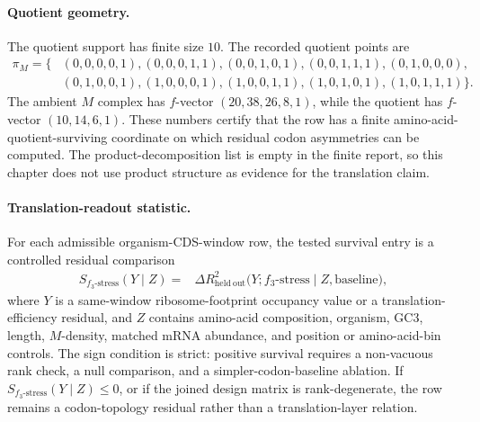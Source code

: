 \paragraph{Quotient geometry.}
The quotient support has finite size $10$.  The recorded quotient points are
$$
\begin{aligned}
\pi_M=\{&(0,0,0,0,1),(0,0,0,1,1),(0,0,1,0,1),(0,0,1,1,1),(0,1,0,0,0),\\
&(0,1,0,0,1),(1,0,0,0,1),(1,0,0,1,1),(1,0,1,0,1),(1,0,1,1,1)\}.
\end{aligned}
$$
The ambient $M$ complex has $f$-vector $(20,38,26,8,1)$, while the quotient has $f$-vector $(10,14,6,1)$.  These numbers certify that the row has a finite amino-acid-quotient-surviving coordinate on which residual codon asymmetries can be computed.  The product-decomposition list is empty in the finite report, so this chapter does not use product structure as evidence for the translation claim.

\paragraph{Translation-readout statistic.}
For each admissible organism-CDS-window row, the tested survival entry is a controlled residual comparison
$$
\begin{aligned}
S_{f_3\text{-stress}}(Y\mid Z)
  ={}&\Delta R^2_{\mathrm{held\ out}}\bigl(Y; f_3\text{-stress}\mid Z,\mathrm{baseline}\bigr),
\end{aligned}
$$
where $Y$ is a same-window ribosome-footprint occupancy value or a translation-efficiency residual, and $Z$ contains amino-acid composition, organism, GC3, length, $M$-density, matched mRNA abundance, and position or amino-acid-bin controls.  The sign condition is strict: positive survival requires a non-vacuous rank check, a null comparison, and a simpler-codon-baseline ablation.  If $S_{f_3\text{-stress}}(Y\mid Z)\leq 0$, or if the joined design matrix is rank-degenerate, the row remains a codon-topology residual rather than a translation-layer relation.

